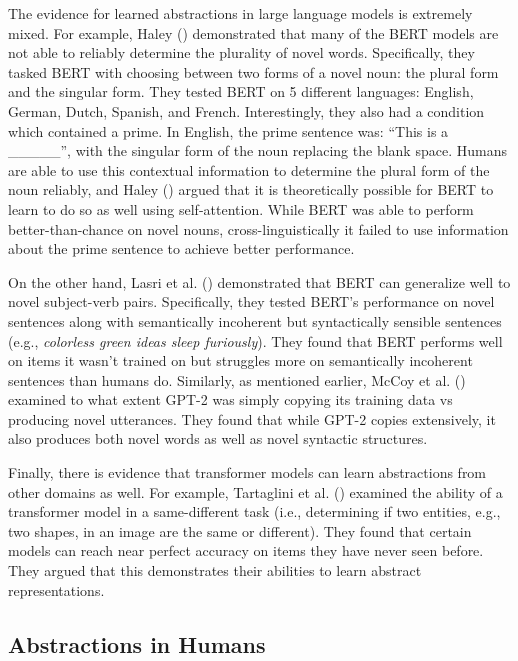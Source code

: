 \documentclass[
  nottoc]{article}
\begin{document}
The evidence for learned abstractions in large language models is
extremely mixed. For example, Haley ()
demonstrated that many of the BERT models are not able to reliably
determine the plurality of novel words. Specifically, they tasked BERT
with choosing between two forms of a novel noun: the plural form and the
singular form. They tested BERT on 5 different languages: English,
German, Dutch, Spanish, and French. Interestingly, they also had a
condition which contained a prime. In English, the prime sentence was:
``This is a \_\_\_\_\_'', with the singular form of the noun replacing
the blank space. Humans are able to use this contextual information to
determine the plural form of the noun reliably, and Haley
() argued that it is theoretically
possible for BERT to learn to do so as well using self-attention. While
BERT was able to perform better-than-chance on novel nouns,
cross-linguistically it failed to use information about the prime
sentence to achieve better performance.

On the other hand, Lasri et al. ()
demonstrated that BERT can generalize well to novel subject-verb pairs.
Specifically, they tested BERT's performance on novel sentences along
with semantically incoherent but syntactically sensible sentences (e.g.,
\emph{colorless green ideas sleep furiously}). They found that BERT
performs well on items it wasn't trained on but struggles more on
semantically incoherent sentences than humans do. Similarly, as
mentioned earlier, McCoy et al. ()
examined to what extent GPT-2 was simply copying its training data vs
producing novel utterances. They found that while GPT-2 copies
extensively, it also produces both novel words as well as novel
syntactic structures.

Finally, there is evidence that transformer models can learn
abstractions from other domains as well. For example, Tartaglini et al.
() examined the ability of a
transformer model in a same-different task (i.e., determining if two
entities, e.g., two shapes, in an image are the same or different). They
found that certain models can reach near perfect accuracy on items they
have never seen before. They argued that this demonstrates their
abilities to learn abstract representations.

\subsection{Abstractions in Humans}\label{abstractions-in-humans}
\end{document}
